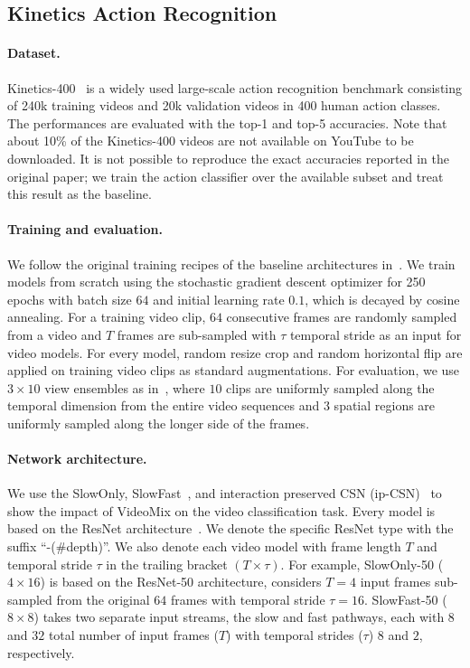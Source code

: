 

\subsection{Kinetics Action Recognition}
\label{section:experiments:kinetics}

\paragraph{Dataset.}
Kinetics-400~\cite{kinetics} is a widely used large-scale action recognition benchmark consisting of 240k training videos and 20k validation videos in 400 human action classes.
The performances are evaluated with the top-1 and top-5 accuracies. 
Note that about 10\% of the Kinetics-400 videos are not available on YouTube to be downloaded. It is not possible to reproduce the exact accuracies reported in the original paper; we train the action classifier over the available subset and treat this result as the baseline.

\paragraph{Training and evaluation.}
We follow the original training recipes of the baseline architectures in~\cite{feichtenhofer2019slowfast}.
We train models from scratch using the stochastic gradient descent optimizer for 250 epochs with batch size $64$ and initial learning rate $0.1$, which is decayed by cosine annealing. 
For a training video clip, $64$ consecutive frames are randomly sampled from a video and $T$ frames are sub-sampled with $\tau$ temporal stride as an input for video models. 
For every model, random resize crop and random horizontal flip are applied on training video clips as standard augmentations.
For evaluation, we use $3\times10$ view ensembles as in~\cite{feichtenhofer2019slowfast}, where $10$ clips are uniformly sampled along the temporal dimension from the entire video sequences and $3$ spatial regions are uniformly sampled along the longer side of the frames.


\paragraph{Network architecture.}
We use the SlowOnly, SlowFast~\cite{feichtenhofer2019slowfast}, and interaction preserved CSN (ip-CSN)~\cite{tran2019CSN} to show the impact of VideoMix on the video classification task. 
Every model is based on the ResNet architecture~\cite{resnet}. We denote the specific ResNet type with the suffix ``-(\#\ignorespaces depth)''.
We also denote each video model with frame length $T$ and temporal stride $\tau$ in the trailing bracket $(T\times\tau)$.
For example, SlowOnly-50 ($4\times16$) is based on the ResNet-50 architecture, considers $T=4$ input frames sub-sampled from the original $64$ frames with temporal stride $\tau=16$.
SlowFast-50 ($8\times8$) takes two separate input streams, the slow and fast pathways, each with $8$ and $32$ total number of input frames ($T$) with temporal strides ($\tau$) $8$ and $2$, respectively.


